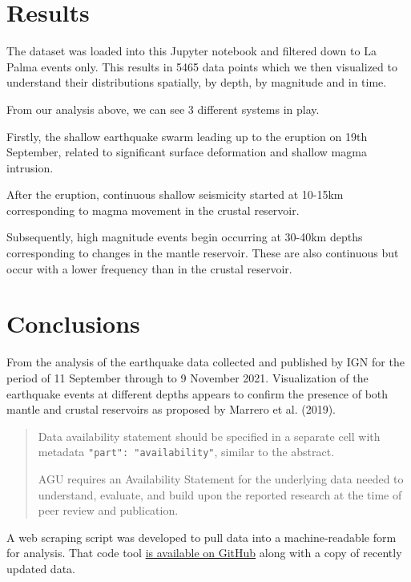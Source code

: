 \documentclass[
]{agujournal2019}
\begin{document}
\hypertarget{results}{%
\section{Results}\label{results}}

The dataset was loaded into this Jupyter notebook and filtered down to
La Palma events only. This results in 5465 data points which we then
visualized to understand their distributions spatially, by depth, by
magnitude and in time.

From our analysis above, we can see 3 different systems in play.

Firstly, the shallow earthquake swarm leading up to the eruption on 19th
September, related to significant surface deformation and shallow magma
intrusion.

After the eruption, continuous shallow seismicity started at 10-15km
corresponding to magma movement in the crustal reservoir.

Subsequently, high magnitude events begin occurring at 30-40km depths
corresponding to changes in the mantle reservoir. These are also
continuous but occur with a lower frequency than in the crustal
reservoir.

\hypertarget{conclusions}{%
\section{Conclusions}\label{conclusions}}

From the analysis of the earthquake data collected and published by IGN
for the period of 11 September through to 9 November 2021. Visualization
of the earthquake events at different depths appears to confirm the
presence of both mantle and crustal reservoirs as proposed by Marrero et
al. (2019).

\begin{quote}
Data availability statement should be specified in a separate cell with
metadata \texttt{"part":\ "availability"}, similar to the abstract.

AGU requires an Availability Statement for the underlying data needed to
understand, evaluate, and build upon the reported research at the time
of peer review and publication.
\end{quote}

A web scraping script was developed to pull data into a machine-readable
form for analysis. That code tool
\href{https://github.com/stevejpurves/ign-earthquake-data}{is available
on GitHub} along with a copy of recently updated data.
\end{document}
